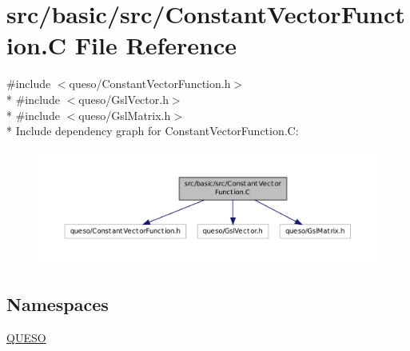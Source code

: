 \hypertarget{_constant_vector_function_8_c}{\section{src/basic/src/\-Constant\-Vector\-Function.C File Reference}
\label{_constant_vector_function_8_c}
}
{\ttfamily \#include $<$queso/\-Constant\-Vector\-Function.\-h$>$}\\*
{\ttfamily \#include $<$queso/\-Gsl\-Vector.\-h$>$}\\*
{\ttfamily \#include $<$queso/\-Gsl\-Matrix.\-h$>$}\\*
Include dependency graph for Constant\-Vector\-Function.\-C\-:
\nopagebreak
\begin{figure}[H]
\begin{center}
\leavevmode
\includegraphics[width=350pt]{_constant_vector_function_8_c__incl}
\end{center}
\end{figure}
\subsection*{Namespaces}
\begin{DoxyCompactItemize}
\item 
\hyperlink{namespace_q_u_e_s_o}{Q\-U\-E\-S\-O}
\end{DoxyCompactItemize}

